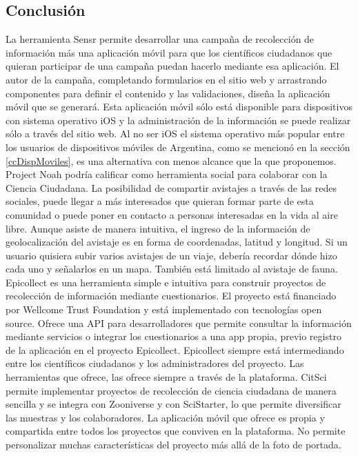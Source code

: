 \subsection{Conclusión}
La herramienta Sensr permite desarrollar una campaña de recolección de información más una aplicación móvil para que los científicos ciudadanos que quieran participar de una campaña puedan hacerlo mediante esa aplicación. El autor de la campaña, completando formularios en el sitio web y arrastrando componentes para definir el contenido y las validaciones, diseña la aplicación móvil que se generará. Esta aplicación móvil sólo está disponible para dispositivos con sistema operativo iOS y la administración de la información se puede realizar sólo a través del sitio web. Al no ser iOS el sistema operativo más popular entre los usuarios de dispositivos móviles de Argentina, como se mencionó en la sección \ref{ccDispMoviles}, es una alternativa con menos alcance que la que proponemos. 
Project Noah podría calificar como herramienta social para colaborar con la Ciencia Ciudadana. La posibilidad de compartir avistajes a través de las redes sociales, puede llegar a más interesados que quieran formar parte de esta comunidad o puede poner en contacto a personas interesadas en la vida al aire libre.
Aunque asiste de manera intuitiva, el ingreso de la información de geolocalización del avistaje es en forma de coordenadas, latitud y longitud. Si un usuario quisiera subir varios avistajes de un viaje, debería recordar dónde hizo cada uno y señalarlos en un mapa. También está limitado al avistaje de fauna.
Epicollect es una herramienta simple e intuitiva para construir proyectos de recolección de información mediante cuestionarios. El proyecto está financiado por Wellcome Trust Foundation y está implementado con tecnologías open source. Ofrece una API para desarrolladores que permite consultar la información mediante servicios o integrar los cuestionarios a una app propia, previo registro de la aplicación en el proyecto Epicollect. Epicollect siempre está intermediando entre los científicos ciudadanos y los administradores del proyecto. Las herramientas que ofrece, las ofrece siempre a través de la plataforma. CitSci permite implementar proyectos de recolección de ciencia ciudadana de manera sencilla y se integra con Zooniverse y con SciStarter, lo que permite diversificar las muestras y los colaboradores. La aplicación móvil que ofrece es propia y compartida entre todos los proyectos que conviven en la plataforma.  No permite personalizar muchas características del proyecto más allá de la foto de portada. 
